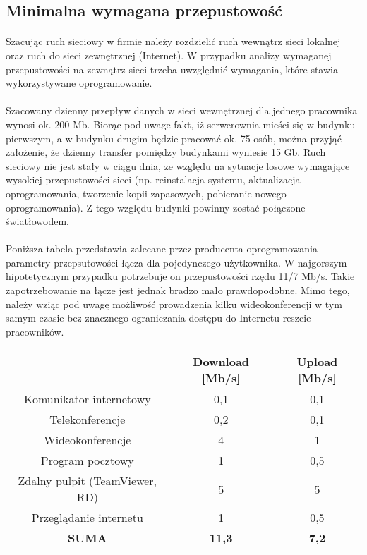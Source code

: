 \subsection{Minimalna wymagana przepustowość}
\paragraph{}
Szacując ruch sieciowy w firmie należy rozdzielić ruch wewnątrz sieci lokalnej oraz ruch do sieci zewnętrznej (Internet). W przypadku analizy wymaganej przepustowości na zewnątrz sieci trzeba uwzględnić wymagania, które stawia wykorzystywane oprogramowanie.

\paragraph{}
Szacowany dzienny przepływ danych w sieci wewnętrznej dla jednego pracownika wynosi ok. 200 Mb. 
Biorąc pod uwage fakt, iż serwerownia mieści się w budynku pierwszym, a w budynku drugim będzie pracować ok. 75 osób, można przyjąć założenie, że dzienny transfer pomiędzy budynkami wyniesie 15 Gb. 
Ruch sieciowy nie jest stały w ciągu dnia, ze względu na sytuacje losowe wymagające wysokiej przepustowości sieci (np. reinstalacja systemu, aktualizacja oprogramowania, tworzenie kopii zapasowych, pobieranie nowego oprogramowania). 
Z tego względu budynki powinny zostać połączone światłowodem.

\paragraph{}
Poniższa tabela przedstawia zalecane przez producenta oprogramowania parametry przepsutowości łącza dla pojedynczego użytkownika. 
W najgorszym hipotetycznym przypadku potrzebuje on przepustowości rzędu 11/7 Mb/s.
Takie zapotrzebowanie na łącze jest jednak bradzo mało prawdopodobne.
Mimo tego, należy wziąc pod uwagę możliwość prowadzenia kilku wideokonferencji w tym samym czasie bez znacznego ograniczania dostępu do Internetu reszcie pracowników.

\begin{center}
    \begin{tabular}{|c|c|c|}
    \hline
       & Download [Mb/s]                & Upload [Mb/s] \\ \hline
       Komunikator internetowy          & 0,1   & 0,1   \\ \hline
       Telekonferencje                  & 0,2   & 0,1   \\ \hline
       Wideokonferencje                 & 4     & 1     \\ \hline
       Program pocztowy                 & 1     & 0,5   \\ \hline
       Zdalny pulpit (TeamViewer, RD)   & 5     & 5     \\ \hline
       Przeglądanie internetu           & 1     & 0,5   \\ \hline
       \textbf{SUMA}					& \textbf{11,3}  & \textbf{7,2}	\\ \hline
   \end{tabular}
\end{center}

